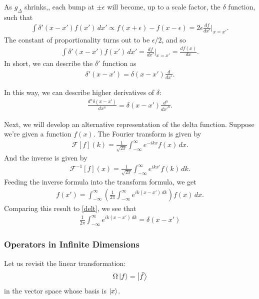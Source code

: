 \documentclass{book}
\theoremstyle{definition}
\newcommand{\F}{\mathcal{F}}
\newcommand{\f}[2]{\frac{#1}{#2}}
\newcommand{\lp}{\left(}
\newcommand{\rp}{\right)}
\begin{document}
As $g_\Delta$ shrinks,, each bump at $\pm \epsilon$ will become, up to a scale factor, the $\delta$ function, such that
\begin{align*}
\int\delta'(x-x')f(x')\,dx' \propto   f(x+\epsilon) - f(x-\epsilon) = 2\epsilon\f{df}{dx'}\bigg\vert_{x=x'}.
\end{align*}
The constant of proportionality turns out to be $\epsilon/2$, and so
\begin{align}
\int \delta'(x-x')f(x')\,dx' = \f{df}{dx'}\bigg\vert_{x=x'} = \f{df(x)}{dx}.
\end{align}
In short, we can describe the $\delta'$ function as 
\begin{align}
\delta'(x-x') = \delta(x-x')\f{d}{dx'}.
\end{align}

In this way, we can describe higher derivatives of $\delta$:
\begin{align}
\f{d^n \delta(x-x')}{dx^n} = \delta(x-x')\f{d^n}{dx'^n}.
\end{align}



Next, we will develop an alternative representation of the delta function. Suppose we're given a function $f(x)$. The Fourier transform is given by 
\begin{align}
\F[f](k) = \f{1}{\sqrt{2\pi}}\int^\infty_{-\infty}e^{-ikx}f(x)\,dx.
\end{align}
And the inverse is given by
\begin{align}
\F^{-1}[f](x) = \f{1}{\sqrt{2\pi}}\int^\infty_{-\infty}e^{ikx'}f(k)\,dk.
\end{align}
Feeding the inverse formula into the transform formula, we get
\begin{align}
f(x') = \int^{\infty}_{-\infty} \lp \f{1}{2\pi} \int^{\infty}_{-\infty}e^{ik(x-x')\,dk} \rp f(x)\,dx.
\end{align}
Comparing this result to \eqref{delt}, we see that
\begin{align}
\boxed{\f{1}{2\pi}\int^\infty_{-\infty}e^{ik(x-x')\,dk} = \delta(x-x')}
\end{align}






\subsubsection{Operators in Infinite Dimensions}

Let us revisit the linear transformation:
\begin{align}
\Omega \ket{f} =\ket{\tilde{f}}
\end{align}
in the vector space whose basis is $\ket{x}$.
\end{document}
